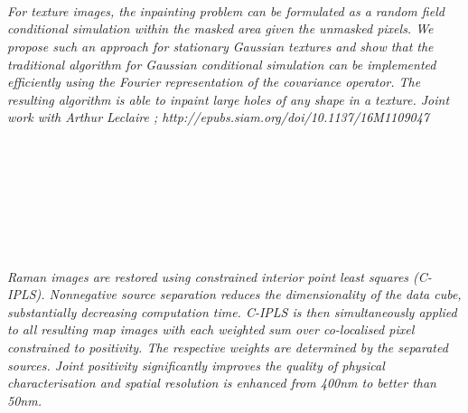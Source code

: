 \begin{multicols}{2}
      \\
      \\\\
      \\
      \\\\
      \\
      \\\\
      \\
      \\\\
\\
    \textit{For texture images, the inpainting problem can be formulated as a random field conditional simulation within the masked area given the unmasked pixels.
We propose such an approach for stationary Gaussian textures and show that the traditional algorithm for Gaussian conditional simulation can be implemented efficiently using the Fourier representation of the covariance operator. 
The resulting algorithm is able to inpaint large holes of any shape in a texture.
Joint work with Arthur Leclaire ; http://epubs.siam.org/doi/10.1137/16M1109047}\\
\\ 
      \\
      \\\\
      \\
      \\\\
\\
    \textit{Raman images are restored using constrained interior point least squares (C-IPLS). Nonnegative source separation reduces the dimensionality of the data cube, substantially decreasing computation time. C-IPLS is then simultaneously applied to all resulting map images with each weighted sum over co-localised pixel constrained to positivity. The respective weights are determined by the separated sources. Joint positivity significantly improves the quality of physical characterisation and spatial resolution is enhanced from 400nm to better than 50nm.}\\
\\ 
      \\

\end{multicols}
